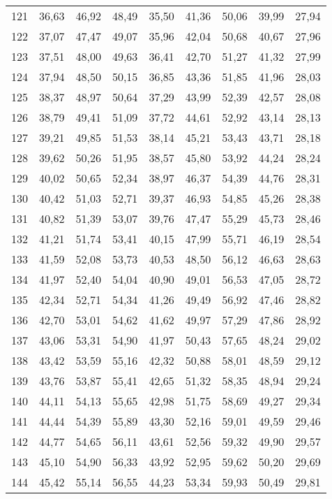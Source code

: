 \begin{longtable}{c c c c c c c c c}
121	& 36,63	& 46,92	& 48,49	& 35,50	& 41,36	& 50,06	& 39,99	& 27,94 \\
122	& 37,07	& 47,47	& 49,07	& 35,96	& 42,04	& 50,68	& 40,67	& 27,96 \\
123	& 37,51	& 48,00	& 49,63	& 36,41	& 42,70	& 51,27	& 41,32	& 27,99 \\
124	& 37,94	& 48,50	& 50,15	& 36,85	& 43,36	& 51,85	& 41,96	& 28,03 \\
125	& 38,37	& 48,97	& 50,64	& 37,29	& 43,99	& 52,39	& 42,57	& 28,08 \\
126	& 38,79	& 49,41	& 51,09	& 37,72	& 44,61	& 52,92	& 43,14	& 28,13 \\
127	& 39,21	& 49,85	& 51,53	& 38,14	& 45,21	& 53,43	& 43,71	& 28,18 \\
128	& 39,62	& 50,26	& 51,95	& 38,57	& 45,80	& 53,92	& 44,24	& 28,24 \\
129	& 40,02	& 50,65	& 52,34	& 38,97	& 46,37	& 54,39	& 44,76	& 28,31 \\
130	& 40,42	& 51,03	& 52,71	& 39,37	& 46,93	& 54,85	& 45,26	& 28,38 \\
131	& 40,82	& 51,39	& 53,07	& 39,76	& 47,47	& 55,29	& 45,73	& 28,46 \\
132	& 41,21	& 51,74	& 53,41	& 40,15	& 47,99	& 55,71	& 46,19	& 28,54 \\
133	& 41,59	& 52,08	& 53,73	& 40,53	& 48,50	& 56,12	& 46,63	& 28,63 \\
134	& 41,97	& 52,40	& 54,04	& 40,90	& 49,01	& 56,53	& 47,05	& 28,72 \\
135	& 42,34	& 52,71	& 54,34	& 41,26	& 49,49	& 56,92	& 47,46	& 28,82 \\
136	& 42,70	& 53,01	& 54,62	& 41,62	& 49,97	& 57,29	& 47,86	& 28,92 \\
137	& 43,06	& 53,31	& 54,90	& 41,97	& 50,43	& 57,65	& 48,24	& 29,02 \\
138	& 43,42	& 53,59	& 55,16	& 42,32	& 50,88	& 58,01	& 48,59	& 29,12 \\
139	& 43,76	& 53,87	& 55,41	& 42,65	& 51,32	& 58,35	& 48,94	& 29,24 \\
140	& 44,11	& 54,13	& 55,65	& 42,98	& 51,75	& 58,69	& 49,27	& 29,34 \\
141	& 44,44	& 54,39	& 55,89	& 43,30	& 52,16	& 59,01	& 49,59	& 29,46 \\
142	& 44,77	& 54,65	& 56,11	& 43,61	& 52,56	& 59,32	& 49,90	& 29,57 \\
143	& 45,10	& 54,90	& 56,33	& 43,92	& 52,95	& 59,62	& 50,20	& 29,69 \\
144	& 45,42	& 55,14	& 56,55	& 44,23	& 53,34	& 59,93	& 50,49	& 29,81 \\

\end{longtable}
